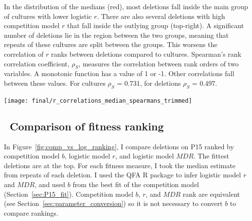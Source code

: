 In the distribution of the medians (red), most deletions fall inside
the main group of cultures with lower logistic \(r\). There are also
several deletions with high competition model \(r\) that fall inside
the outlying group (top-right). A significant number of deletions lie
in the region between the two groups, meaning that repeats of these
cultures are split between the groups. This worsens the correlation of
\(r\) ranks between deletions compared to cultures.  Spearman's rank
correlation coefficient, \(\rho_{S}\), measures the correlation
between rank orders of two variables. A monotonic function has a value
of 1 or -1. Other correlations fall between these values. For cultures
\(\rho_{S}\) = 0.731, for deletions \(\rho_{S}\) =
0.497.

\graphicspath{{images/p15_correlations/}}
\begin{Figure}
  \centering
  \texttt{[image: final/r\_correlations\_median\_spearmans\_trimmed]}
  \label{fig:P15_correlations}
\end{Figure}

\subsection{\thesubsection~Comparison of fitness ranking}


In Figure~\ref{fig:comp_vs_log_ranking}, I compare deletions on P15
ranked by competition model \(b\), logistic model \(r\), and logistic
model \(MDR\). The fittest deletions are at the top. For each fitness
measure, I took the median estimate from repeats of each deletion. I
used the QFA R package to infer logistic model \(r\) and \(MDR\), and
used \(b\) from the best fit of the competition model
(Section~\ref{sec:P15_fit}). Competition model \(b\), \(r\), and
\(MDR\) rank are equivalent (see
Section~\ref{sec:parameter_conversion}) so it is not necessary to
convert \(b\) to compare rankings.

